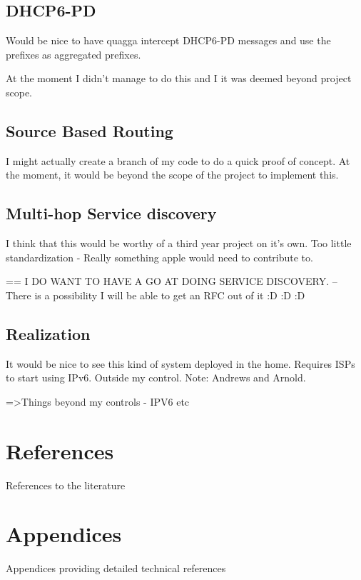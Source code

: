 \documentclass[12pt]{report}
\begin{document}
\section{DHCP6-PD}
Would be nice to have quagga intercept DHCP6-PD messages and use the prefixes as aggregated prefixes. 

At the moment I didn't manage to do this and I it was deemed beyond project scope.

\section{Source Based Routing}
I might actually create a branch of my code to do a quick proof of concept. At the moment, 
it would be beyond the scope of the project to implement this. 

\section{Multi-hop Service discovery}
I think that this would be worthy of a third year project on it's own. 
Too little standardization - Really something apple would need to contribute to. 

== I DO WANT TO HAVE A GO AT DOING SERVICE DISCOVERY.
-- There is a possibility I will be able to get an RFC out of it :D :D :D

\section{Realization}
It would be nice to see this kind of system deployed in the home. 
Requires ISPs to start using IPv6.
Outside my control. 
Note: Andrews and Arnold.

=>Things beyond my controls - IPV6 etc

\chapter{References}
References to the literature

\chapter{Appendices}
Appendices providing detailed technical references
\end{document}
